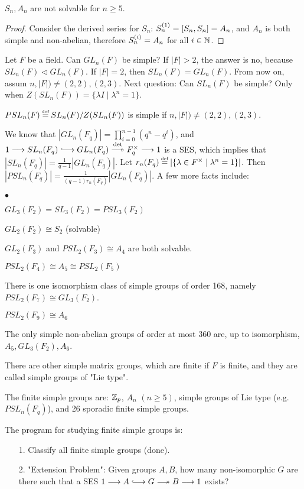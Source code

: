 \documentclass[11pt]{book}
\theoremstyle{definition}   \newtheorem{defn}[counter]{Definition} %
\newcommand\myeq{\mathrel{\overset{\makebox[0pt]{\mbox{\normalfont\tiny\sffamily \textrm{def}}}}{=}}}
\newcommand{\tl}{\triangleleft}   \newcommand{\sd}[1]{\rtimes_{#1}}   \newcommand{\x}{^{\times}}   \newcommand{\cyc}[1]{\begin{pmatrix} #1 \end{pmatrix}}
\newcommand{\hooklongrightarrow}{\lhook\joinrel\longrightarrow}   \newcommand{\twoheadlongrightarrow}{\relbar\joinrel\twoheadrightarrow}
\newcommand{\ses}[5]{1 \longrightarrow #1 \overset{#2}{\hooklongrightarrow} #3 \overset{#4}{\twoheadlongrightarrow} #5 \longrightarrow 1}
\newcommand{\vs}{\vspace{8pt}}
\numberwithin{counter}{chapter}
\begin{document}
\vs

\begin{corollary}
$S_n, A_n$ are not solvable for $n \geq 5$.
\end{corollary}

\begin{proof}
Consider the derived series for $S_n$: $S_n^{(1)} = [S_n,S_n] = A_n$, and $A_n$ is both simple and non-abelian, therefore $S_n^{(i)} = A_n$ for all $i \in \operatorname{\mathbb{N}}$.
\end{proof}

\vs

\begin{example}
Let $F$ be a field. Can $GL_n(F)$ be simple? If $|F| > 2$, the answer is no, because $SL_n(F) \tl GL_n(F)$. If $|F|= 2$, then $SL_n(F) = GL_n(F)$. From now on, assum $n,|F|) \ne (2,2), (2,3)$. Next question: Can $SL_n(F)$ be simple? Only when $Z(SL_n(F)) = \{ \lambda I \mid \lambda^n=1\}$.

\begin{theorem*}
$PSL_n(F) \myeq SL_n(F)/Z(SL_n(F))$ is simple if $n,|F|) \ne (2,2), (2,3)$.
\end{theorem*}

\vs

We know that $|GL_n(F_q)| = \prod_{i=0}^{n-1} (q^n-q^i)$, and $\ses{SL_n(F_q)}{}{GL_n(F_q)}{\det}{F_q\x}$ is a SES, which implies that $|SL_n(F_q)| = \frac{1}{q-1} |GL_n(F_q)|$. Let $r_n(F_q) \myeq |\{\lambda \in F\x \mid \lambda^n=1\}|$. Then $|PSL_n(F_q)| = \frac{1}{(q-1)r_n(F_q)} |GL_n(F_q)|$. A few more facts include:
	\begin{list}{$\bullet$}{}
	\item $GL_3(F_2) = SL_3(F_2) = PSL_3(F_2)$
	\item $GL_2(F_2) \cong S_2$ (solvable)
	\item $GL_2(F_3)$ and $PSL_2(F_3) \cong A_4$ are both solvable.
	\item $PSL_2(F_4) \cong A_5 \cong PSL_2(F_5)$
	\item There is one isomorphism class of simple groups of order 168, namely $PSL_2(F_7) \cong GL_3(F_2)$.
	\item $PSL_2(F_9) \cong A_6$
	\item The only simple non-abelian groups of order at most 360 are, up to isomorphism, $A_5, GL_3(F_2), A_6$.
	\item There are other simple matrix groups, which are finite if $F$ is finite, and they are called simple groups of "Lie type".
	\item The finite simple groups are: $\operatorname{\mathbb{Z}}_p$, $A_n$ $(n \geq 5)$, simple groups of Lie type (e.g. $PSL_n(F_q)$), and 26 sporadic finite simple groups.
	\end{list}

The program for studying finite simple groups is:
	\begin{enumerate}
	\item[1. ] Classify all finite simple groups (done).
	\item[2. ] "Extension Problem": Given groups $A,B$, how many non-isomorphic $G$ are there such that a SES $\ses{A}{}{G}{}{B}$ exists?
	\end{enumerate}
\end{example}
\end{document}
